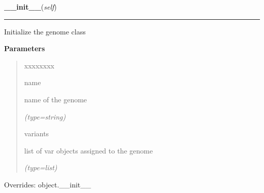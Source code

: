 \hspace{.8\funcindent}\begin{boxedminipage}{\funcwidth}

    \raggedright \textbf{\_\_init\_\_}(\textit{self})

    \vspace{-1.5ex}

    \rule{\textwidth}{0.5\fboxrule}
\setlength{\parskip}{2ex}
    Initialize the genome class

\setlength{\parskip}{1ex}
      \textbf{Parameters}
      \vspace{-1ex}

      \begin{quote}
        \begin{Ventry}{xxxxxxxx}

          \item[name]

          name of the genome

            {\it (type=string)}

          \item[variants]

          list of var objects assigned to the genome

            {\it (type=list)}

        \end{Ventry}

      \end{quote}

      Overrides: object.\_\_init\_\_

    \end{boxedminipage}

    \label{script-phyloFixedVar:genome:setName}

    \vspace{0.5ex}

